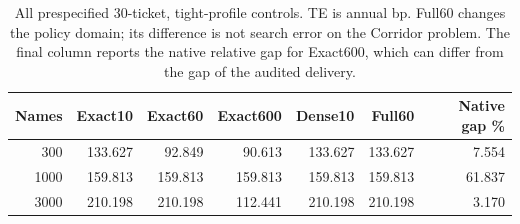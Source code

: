 \begin{table}[htbp]\centering\small\setlength{\tabcolsep}{4pt}
\caption{All prespecified 30-ticket, tight-profile controls. TE is annual bp. Full60 changes the policy domain; its difference is not search error on the Corridor problem. The final column reports the native relative gap for Exact600, which can differ from the gap of the audited delivery.}\label{tab:studycontrols}
\begin{tabular}{rrrrrrr}\toprule
Names & Exact10 & Exact60 & Exact600 & Dense10 & Full60 & Native gap \%\\\midrule
300 & 133.627 & 92.849 & 90.613 & 133.627 & 133.627 & 7.554\\
1000 & 159.813 & 159.813 & 159.813 & 159.813 & 159.813 & 61.837\\
3000 & 210.198 & 210.198 & 112.441 & 210.198 & 210.198 & 3.170\\
\bottomrule\end{tabular}\end{table}

